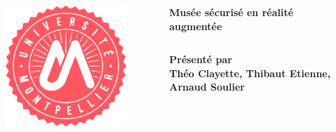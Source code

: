 \documentclass{beamer}
\begin{document}
    \begin{frame}[t]

        \begin{block}{}
            \begin{columns}[t]
                \begin{column}{.1\linewidth}
                    \begin{figure}[t]
                        \includegraphics[width=\linewidth]{rsc/logo_um.png}
                    \end{figure}
                \end{column}

                \begin{column}{.75\linewidth}
                    \begin{center}
                        {\Huge \textbf{Musée sécurisé en réalité augmentée}}
                    \end{center}

                    \begin{columns}[t]
                        \begin{column}{.5\linewidth}
                            \begin{center}
                                \textbf{Présenté par\\Théo Clayette, Thibaut Etienne, Arnaud Soulier}
                            \end{center}
                        \end{column}


\end{columns}
\end{column}
\end{columns}
\end{block}
\end{frame}
\end{document}
